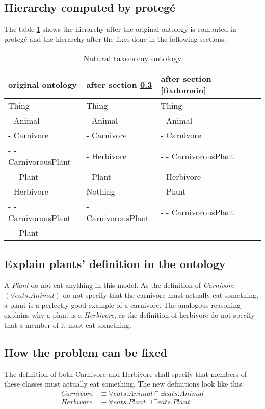 \documentclass[a4paper,12pt]{article}
\begin{document}
\subsection[Hierarchy]{Hierarchy computed by proteg\'e}
The table \ref{protege} shows the hierarchy after the original ontology is
computed in proteg\'e and the hierarchy after the fixes done in the following
sections.
\begin{table}[!htp]
\centering
\begin{tabular}{|l|l|l|l|}
\hline
original ontology             &
after section \ref{fixforall} &
after section \ref{fixdomain} \\
\hline \hline
Thing                & Thing              & Thing                \\
- Animal             & - Animal           & - Animal             \\
- Carnivore          & - Carnivore        & - Carnivore          \\
- - CarnivorousPlant & - Herbivore        & - - CarnivorousPlant \\
- - Plant            & - Plant            & - Herbivore          \\
- Herbivore          & Nothing            & - Plant              \\
- - CarnivorousPlant & - CarnivorousPlant & - - CarnivorousPlant \\
- - Plant            &                    &\\
\hline
\end{tabular}
\caption{Natural taxonomy ontology}
\label{protege}
\end{table}

\subsection[Explain misbehaviour]{Explain plants' definition in the ontology}
A \emph{Plant} do not eat anything in this model.  As the definition of
\emph{Carnivore} $ (\forall eats.Animal) $ do not specify that the carnivore
must actually eat something, a plant is a perfectly good example of a
carnivore.  The analogous reasoning explains why a plant is a \emph{Herbivore},
as the definition of herbivore do not specify that a member of it must eat
something.

\subsection[First fix]{How the problem can be fixed}
\label{fixforall}
The definition of both Carnivore and Herbivore shall specify that members of
these classes must actually eat something.  The new definitions look like this:
\begin{align*}
Carnivore &\equiv \forall eats.Animal \sqcap \exists eats.Animal\\
Herbivore &\equiv \forall eats.Plant  \sqcap \exists eats.Plant
\end{align*}
\end{document}
